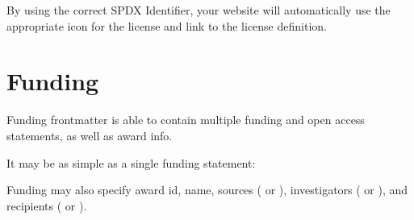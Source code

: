 \documentclass[letterpaper,12pt,english]{sphinxmanual}
\begin{document}
\sphinxAtStartPar
By using the correct SPDX Identifier, your website will automatically use the appropriate icon for the license and link to the license definition.


\section{Funding}
\label{\detokenize{notebooks/02-myst.integration:funding}}
\sphinxAtStartPar
Funding frontmatter is able to contain multiple funding and open access statements, as well as award info.

\sphinxAtStartPar
It may be as simple as a single funding statement:

\begin{sphinxVerbatim}[commandchars=\\\{\}]
\end{sphinxVerbatim}

\sphinxAtStartPar
Funding may also specify award id, name, sources ( or ), investigators ( or ), and recipients ( or ).
\end{document}
